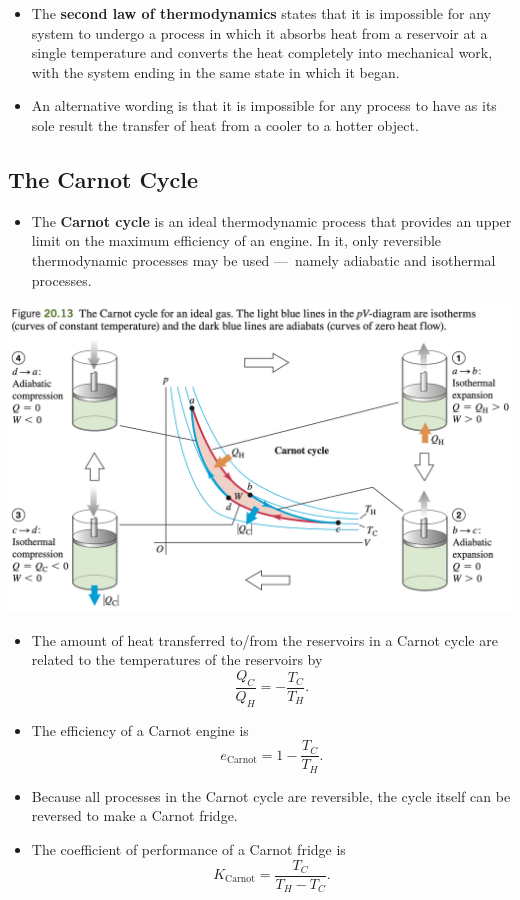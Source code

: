 \documentclass{article}
\begin{document}
\begin{itemize}
  \item The \textbf{second law of thermodynamics} states that it is impossible for any system to undergo a process in which it absorbs heat from a reservoir at a single temperature and converts the heat completely into mechanical work, with the system ending in the same state in which it began.

  \item An alternative wording is that it is impossible for any process to have as its sole result the transfer of heat from a cooler to a hotter object.
\end{itemize}

\subsection{The Carnot Cycle}

\begin{itemize}
  \item The \textbf{Carnot cycle} is an ideal thermodynamic process that provides an upper limit on the maximum efficiency of an engine. In it, only reversible thermodynamic processes may be used — namely adiabatic and isothermal processes.
\end{itemize}

\includegraphics[scale=0.464]{carnot-cycle}

\begin{itemize}
  \item The amount of heat transferred to/from the reservoirs in a Carnot cycle are related to the temperatures of the reservoirs by \[\frac{Q_C}{Q_H} = -\frac{T_C}{T_H}.\]

  \item The efficiency of a Carnot engine is \[e_\text{Carnot} = 1 - \frac{T_C}{T_H}.\]

  \item Because all processes in the Carnot cycle are reversible, the cycle itself can be reversed to make a Carnot fridge.

  \item The coefficient of performance of a Carnot fridge is \[K_\text{Carnot} = \frac{T_C}{T_H - T_C}.\]
\end{itemize}
\end{document}
